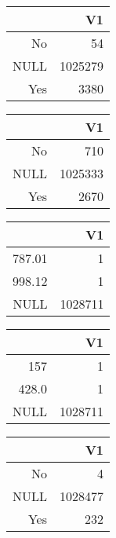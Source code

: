 \bigskip\bigskip
\centering
\begin{tabular}{rr}
  \hline
 & V1 \\ 
  \hline
No &  54 \\ 
  NULL & 1025279 \\ 
  Yes & 3380 \\ 
   \hline
\end{tabular}

\bigskip\bigskip
\centering
\begin{tabular}{rr}
  \hline
 & V1 \\ 
  \hline
No & 710 \\ 
  NULL & 1025333 \\ 
  Yes & 2670 \\ 
   \hline
\end{tabular}

\bigskip\bigskip
\centering
\begin{tabular}{rr}
  \hline
 & V1 \\ 
  \hline
787.01 &   1 \\ 
  998.12 &   1 \\ 
  NULL & 1028711 \\ 
   \hline
\end{tabular}

\bigskip\bigskip
\centering
\begin{tabular}{rr}
  \hline
 & V1 \\ 
  \hline
157 &   1 \\ 
  428.0 &   1 \\ 
  NULL & 1028711 \\ 
   \hline
\end{tabular}

\bigskip\bigskip
\centering
\begin{tabular}{rr}
  \hline
 & V1 \\ 
  \hline
No &   4 \\ 
  NULL & 1028477 \\ 
  Yes & 232 \\ 
   \hline
\end{tabular}

